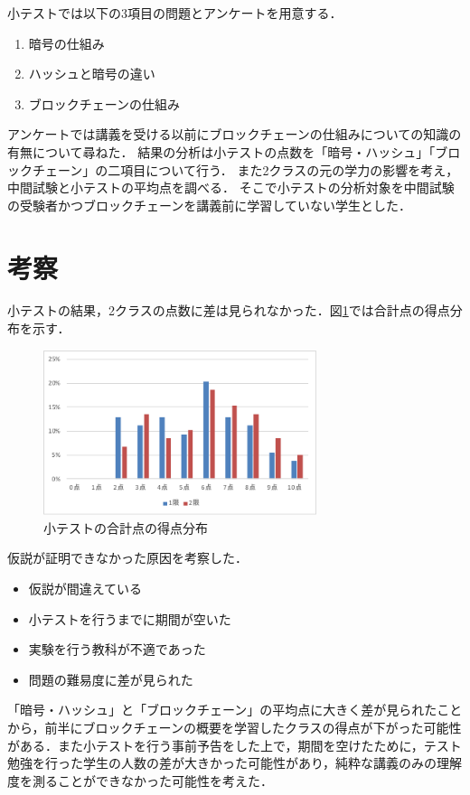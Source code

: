 \documentclass[twocolumn,10pt,a4j]{jsarticle}
\begin{document}
小テストでは以下の3項目の問題とアンケートを用意する．
\begin{enumerate}
\renewcommand {\labelenumi}{(\arabic{enumi})}
\item 暗号の仕組み
\item ハッシュと暗号の違い
\item ブロックチェーンの仕組み
\end{enumerate}

アンケートでは講義を受ける以前にブロックチェーンの仕組みについての知識の有無について尋ねた．
結果の分析は小テストの点数を「暗号・ハッシュ」「ブロックチェーン」の二項目について行う．
また2クラスの元の学力の影響を考え，中間試験と小テストの平均点を調べる．
そこで小テストの分析対象を中間試験の受験者かつブロックチェーンを講義前に学習していない学生とした．


\section{考察}

小テストの結果，2クラスの点数に差は見られなかった．図\ref{fig:total}では合計点の得点分布を示す．

\begin{figure}[H]
\centering
\includegraphics[width=8cm]{total.pdf}
\caption{小テストの合計点の得点分布}
\label{fig:total}
\end{figure}

仮説が証明できなかった原因を考察した．
\begin{itemize}
\item 仮説が間違えている
\item 小テストを行うまでに期間が空いた
\item 実験を行う教科が不適であった
\item 問題の難易度に差が見られた
\end{itemize}

「暗号・ハッシュ」と「ブロックチェーン」の平均点に大きく差が見られたことから，前半にブロックチェーンの概要を学習したクラスの得点が下がった可能性がある．また小テストを行う事前予告をした上で，期間を空けたために，テスト勉強を行った学生の人数の差が大きかった可能性があり，純粋な講義のみの理解度を測ることができなかった可能性を考えた．
\end{document}
